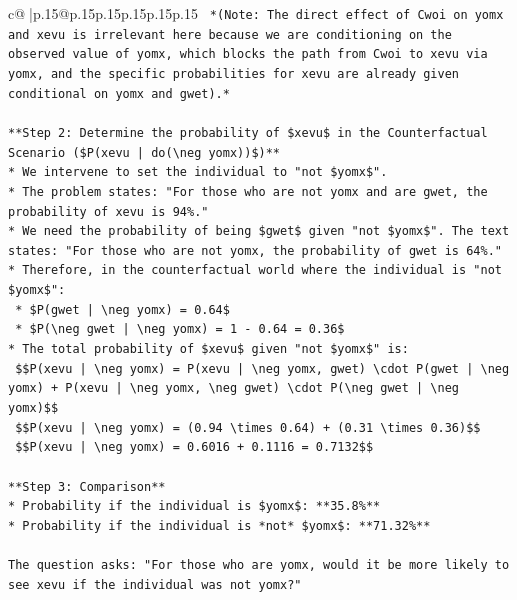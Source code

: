 \documentclass{article}
\begin{document}
{\begin{supertabular}{c@{$\;$}|p{.15\linewidth}@{}p{.15\linewidth}p{.15\linewidth}p{.15\linewidth}p{.15\linewidth}p{.15\linewidth}}
{{{\texttt{    *(Note: The direct effect of Cwoi on yomx and xevu is irrelevant here because we are conditioning on the observed value of yomx, which blocks the path from Cwoi to xevu via yomx, and the specific probabilities for xevu are already given conditional on yomx and gwet).*} \\
\\ 
\texttt{**Step 2: Determine the probability of \$xevu\$ in the Counterfactual Scenario (\$P(xevu | do(\textbackslash{}neg yomx))\$)**} \\
\texttt{*   We intervene to set the individual to "not \$yomx\$".} \\
\texttt{*   The problem states: "For those who are not yomx and are gwet, the probability of xevu is 94\%."} \\
\texttt{*   We need the probability of being \$gwet\$ given "not \$yomx\$". The text states: "For those who are not yomx, the probability of gwet is 64\%."} \\
\texttt{*   Therefore, in the counterfactual world where the individual is "not \$yomx\$":} \\
\texttt{    *   \$P(gwet | \textbackslash{}neg yomx) = 0.64\$} \\
\texttt{    *   \$P(\textbackslash{}neg gwet | \textbackslash{}neg yomx) = 1 {-} 0.64 = 0.36\$} \\
\texttt{*   The total probability of \$xevu\$ given "not \$yomx\$" is:} \\
\texttt{    \$\$P(xevu | \textbackslash{}neg yomx) = P(xevu | \textbackslash{}neg yomx, gwet) \textbackslash{}cdot P(gwet | \textbackslash{}neg yomx) + P(xevu | \textbackslash{}neg yomx, \textbackslash{}neg gwet) \textbackslash{}cdot P(\textbackslash{}neg gwet | \textbackslash{}neg yomx)\$\$} \\
\texttt{    \$\$P(xevu | \textbackslash{}neg yomx) = (0.94 \textbackslash{}times 0.64) + (0.31 \textbackslash{}times 0.36)\$\$} \\
\texttt{    \$\$P(xevu | \textbackslash{}neg yomx) = 0.6016 + 0.1116 = 0.7132\$\$} \\
\\ 
\texttt{**Step 3: Comparison**} \\
\texttt{*   Probability if the individual is \$yomx\$: **35.8\%**} \\
\texttt{*   Probability if the individual is *not* \$yomx\$: **71.32\%**} \\
\\ 
\texttt{The question asks: "For those who are yomx, would it be more likely to see xevu if the individual was not yomx?"} \\
}}}
\end{supertabular}}
\end{document}
